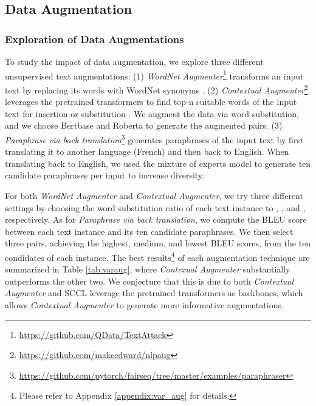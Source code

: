 \documentclass[11pt]{article}
\begin{document}
\subsection{Data Augmentation}
\label{subsec:data_aug}
\subsubsection{Exploration of Data Augmentations}
\label{subsec:var_aug}
To study the impact of data augmentation, we explore three different unsupervised text augmentations: (1) \textit{WordNet Augmenter}\footnote{\url{https://github.com/QData/TextAttack}} transforms an input text by replacing its words with WordNet synonyms
\citep{morris2020textattack,ren2019generating}. (2) \textit{Contextual Augmenter}\footnote{\url{https://github.com/makcedward/nlpaug}} leverages the pretrained transformers to find top-n suitable words of the input text for insertion or substitution  \citep{kobayashi2018contextual,ma2019nlpaug}. We augment the data via word substitution, and we choose Bertbase and Roberta to generate the augmented pairs.
(3) \textit{Paraphrase via back translation}\footnote{ \url{https://github.com/pytorch/fairseq/tree/master/examples/paraphraser}} generates paraphrases of the input text by first translating it to another language (French) and then back to English. When translating back to English, we used the mixture of experts model \cite{shen2019mixture} to generate ten candidate paraphrases per input to increase diversity. 

For both \textit{WordNet Augmenter} and \textit{Contextual Augmenter}, we try three different settings by choosing the word substitution ratio of each text instance to , , and , respectively. As for \textit{Paraphrase via back translation}, we compute the BLEU score between each text instance and its ten candidate paraphrases. We then select three pairs, achieving the highest, medium, and lowest BLEU scores, from the ten condidates of each instance. The best results\footnote{Please refer to Appendix \ref{appendix:var_aug} for details.} of each augmentation technique are summarized in Table \ref{tab:varaug}, where \textit{Contexual Augmenter} substantially outperforms the other two. We conjecture that this is due to both \textit{Contextual Augmenter} and SCCL leverage the pretrained transformers as backbones, which allows \textit{Contextual Augmenter} to generate more informative augmentations.
\end{document}
